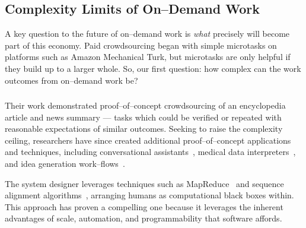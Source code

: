 \documentclass[trackingWork]{subfiles}
\begin{document}
\begin{comment}
Crowdwork
  - Kittur said let's do complex stuff
  - This works by using CS techniques
  - Clear that this works in focused cases
  - More recent shift toward using experts
\end{comment}

\subsection[What are the complexity limits of on--demand work]
{Complexity Limits of On--Demand Work}\label{sec:complexity}
A key question to the future of on--demand work is
\textit{what} precisely will become part of this economy.
Paid crowdsourcing began with simple microtasks on platforms such as
Amazon Mechanical Turk, but
microtasks are only helpful if they build up to a larger whole.
So, our first question:
how complex can the work outcomes from on--demand work be?

\subsubsection{\crowdworkpers}
Their work demonstrated proof--of--concept crowdsourcing of
an encyclopedia article and news summary
--- tasks which could be verified or repeated
with reasonable expectations of similar outcomes.
Seeking to raise the complexity ceiling,
researchers have since created
additional proof--of--concept applications and techniques,
including conversational assistants~\cite{lasecki2013chorus},
medical data interpreters~\cite{lasecki2013chorus}, and
idea generation work--flows~\cite{YuEncouragingOutside,yu2014distributed,Yu2016a}.

The system designer leverages techniques such as MapReduce~\cite{crowdForgeKittur} and
sequence alignment algorithms~\cite{lasecki2012real}, arranging humans as computational black boxes within.
This approach has proven a compelling one because
it leverages the inherent advantages of
scale,
automation, and
programmability that software affords.
\end{document}
